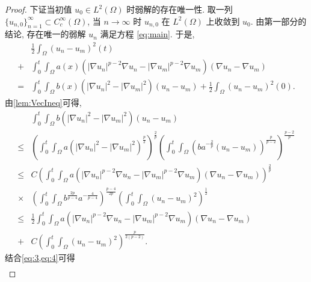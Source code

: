 \documentclass[oneside,longtitle]{LZUthesis}
\numberwithin{equation}{chapter}
\newcommand*\abs[1]{\lvert#1\rvert}
\newcommand*\Brace[1]{\lbrace#1\rbrace}
\begin{document}
\begin{proof}
	下证当初值 $u_0 \in L^2(\Omega)$ 时弱解的存在唯一性.
	取一列 $\Brace{u_{n, 0}}_{n=1}^{\infty} \subset C_c^{\infty}(\Omega)$,
	当 $n \to \infty $ 时 $u_{n, 0}$ 在 $L^2(\Omega)$ 上收敛到 $u_0$.
	由第一部分的结论, 存在唯一的弱解 $u_n$ 满足方程 \eqref{eq:main}.
	于是,
	\begin{equation}\label{eq:3}
		\begin{split}
			& \frac{1}{2}\int_{\Omega}\left(u_n-u_m\right)^2(t)\\
			+{} & \int_{0}^{t}\int_{\Omega}a(x)
			\left(\abs{\nabla u_n}^{p-2}\nabla u_n
			- \abs{\nabla u_m}^{p-2}\nabla u_m\right)
			\left(\nabla u_n - \nabla u_m\right)\\
			={} & \int_{0}^{t}\int_{\Omega}b(x)\left(\abs{\nabla u_n}^2
			- \abs{\nabla u_m}^2\right)\left(u_n - u_m\right)
			+ \frac{1}{2}\int_{\Omega}\left(u_n-u_m\right)^2(0).
		\end{split}
	\end{equation}
	由\cref{lem:VecIneq}可得,
	\begin{equation}\label{eq:4}
		\begin{split}
			& \int_{0}^{t}\int_{\Omega}b\left(\abs{\nabla u_n}^2
			- \abs{\nabla u_m}^2\right)\left(u_n - u_m\right)\\
			\leq{} & \left(\int_0^t\int_{\Omega}a\left(\abs{\nabla u_n}^2
			- \abs{\nabla u_m}^2\right)^{\frac{p}{2}}\right)^{\frac{2}{p}}
			\left(\int_0^t\int_{\Omega}\left(ba^{-\frac{2}{p}}
			\left(u_n-u_m\right)\right)^{\frac{p}{p-2}}\right)^{\frac{p-2}{p}}\\
			\leq{} & C\left(\int_0^t\int_{\Omega}a
			\left(\abs{\nabla u_n}^{p-2}\nabla u_n
			- \abs{\nabla u_m}^{p-2}\nabla u_m\right)
			\left(\nabla u_n - \nabla u_m\right)\right)^{\frac{2}{p}}\\
			\times{} & \left(\int_0^t\int_{\Omega}b^{\frac{2p}{p-4}}a^{-\frac{4}{p-4}}\right)^{\frac{p-4}{2p}}
			\left(\int_0^t\int_{\Omega}\left(u_n-u_m\right)^2\right)^{\frac{1}{2}}\\
			\leq{} & \frac{1}{2}\int_0^t\int_{\Omega}a
			\left(\abs{\nabla u_n}^{p-2}\nabla u_n
			- \abs{\nabla u_m}^{p-2}\nabla u_m\right)
			\left(\nabla u_n - \nabla u_m\right)\\
			+{} & C\left(\int_0^t\int_{\Omega}\left(u_n-u_m\right)^2\right)^{\frac{p}{2(p-2)}}.
		\end{split}
	\end{equation}
	结合\cref{eq:3,eq:4}可得
	\begin{equation}\label{un-umL2_0TW1p_bd_0TL2_L20}
		\begin{split}

\end{split}
\end{equation}
\end{proof}
\end{document}
